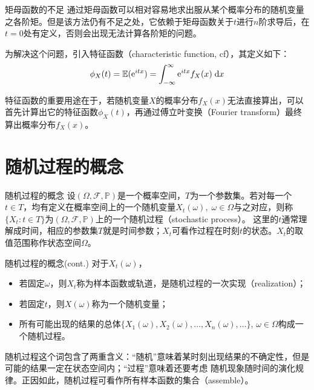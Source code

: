 \documentclass[t]{beamer}
\newcommand{\dif}{{\;\rm d}}
\renewcommand{\Pr}{\mathbb{P}}
\newcommand{\E}{\mathbb{E}}
\begin{document}
  \begin{frame}{矩母函数的不足}
    通过矩母函数可以相对容易地求出服从某个概率分布的随机变量之各阶矩。但是该方法仍有不足之处，它依赖于矩母函数关于$t$进行$n$阶求导后，在$t=0$处有定义，否则会出现无法计算各阶矩的问题。

    为解决这个问题，引入特征函数（characteristic function, cf），其定义如下：
    \begin{equation*}\phi_X(t)=\E({\rm
    e}^{itx})=\int^{\infty}_{-\infty} {\rm e}^{itx}f_X(x)\dif x
    \end{equation*}
  
    特征函数的重要用途在于，若随机变量$X$的概率分布$f_X(x)$无法直接算出，可以首先计算出它的特征函数$\phi_X(t)$，再通过傅立叶变换（Fourier
transform）最终算出概率分布$f_X(x)$。
  \end{frame}


  \section{随机过程的概念}
  \begin{frame}{随机过程的概念}
    设$(\Omega,\mathcal{F},\Pr)$是一个概率空间，$T$为一个参数集。若对每一个$t\in
    T$，均有定义在概率空间上的一个随机变量$X_t(\omega),\;
    \omega\in\Omega$与之对应，则称$\{X_t:t\in
    T\}$为$(\Omega,\mathcal{F},\Pr)$上的一个随机过程（stochastic process）。
    这里的$t$通常理解成时间，相应的参数集$T$就是时间参数；$X_t$可看作过程在时刻$t$的状态。$X_t$的取值范围称作状态空间$\Omega$。
    
  
  \end{frame}



  \begin{frame}{随机过程的概念(cont.)}
    对于$X_t(\omega)$，
  \begin{itemize}
    \item 若固定$\omega$，则$X_t$称为样本函数或轨道，是随机过程的一次实现（realization）；
    \item 若固定$t$，则$X(\omega)$称为一个随机变量；
    \item 所有可能出现的结果的总体$\{X_1(\omega),X_2(\omega),\ldots,X_n(\omega),\ldots\}$,
    $\omega\in\Omega$构成一个随机过程。
  \end{itemize}

  随机过程这个词包含了两重含义：“随机”意味着某时刻出现结果的不确定性，但是可能的结果一定在状态空间内；“过程”意味着还要考虑
随机现象随时间的演化规律。正因如此，随机过程可看作所有样本函数的集合（assemble）。
  \end{frame}
\end{document}
